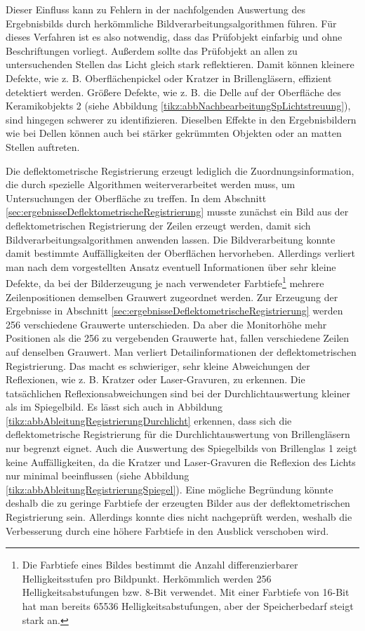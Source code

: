 \noindent
Dieser Einfluss kann zu Fehlern in der nachfolgenden Auswertung des Ergebnisbilds durch herkömmliche Bildverarbeitungsalgorithmen führen.
Für dieses Verfahren ist es also notwendig, dass das Prüfobjekt einfarbig und ohne Beschriftungen vorliegt.
Außerdem sollte das Prüfobjekt an allen zu untersuchenden Stellen das Licht gleich stark reflektieren.
Damit können kleinere Defekte, wie z. B. Oberflächenpickel oder Kratzer in Brillengläsern, effizient detektiert werden.
Größere Defekte, wie z. B. die Delle auf der Oberfläche des Keramikobjekts 2 (siehe Abbildung \ref{tikz:abbNachbearbeitungSpLichtstreuung}), sind hingegen schwerer zu identifizieren.
Dieselben Effekte in den Ergebnisbildern wie bei Dellen können auch bei stärker gekrümmten Objekten oder an matten Stellen auftreten.

\p
Die deflektometrische Registrierung erzeugt lediglich die Zuordnungsinformation, die durch spezielle Algorithmen weiterverarbeitet werden muss, um Untersuchungen der Oberfläche zu treffen.
In dem Abschnitt \ref{sec:ergebnisseDeflektometrischeRegistrierung} musste zunächst ein Bild aus der deflektometrischen Registrierung der Zeilen erzeugt werden, damit sich Bildverarbeitungsalgorithmen anwenden lassen.
Die Bildverarbeitung konnte damit bestimmte Auffälligkeiten der Oberflächen hervorheben.
Allerdings verliert man nach dem vorgestellten Ansatz eventuell Informationen über sehr kleine Defekte, da bei der Bilderzeugung je nach verwendeter Farbtiefe\footnote
{
Die Farbtiefe eines Bildes bestimmt die Anzahl differenzierbarer Helligkeitsstufen pro Bildpunkt.
Herkömmlich werden 256 Helligkeitsabstufungen bzw. 8-Bit verwendet.
Mit einer Farbtiefe von 16-Bit hat man bereits 65536 Helligkeitsabstufungen, aber der Speicherbedarf steigt stark an.
%
} mehrere Zeilenpositionen demselben Grauwert zugeordnet werden.
Zur Erzeugung der Ergebnisse in Abschnitt \ref{sec:ergebnisseDeflektometrischeRegistrierung} werden 256 verschiedene Grauwerte unterschieden.
Da aber die Monitorhöhe mehr Positionen als die 256 zu vergebenden Grauwerte hat, fallen verschiedene Zeilen auf denselben Grauwert.
Man verliert Detailinformationen der deflektometrischen Registrierung.
Das macht es schwieriger, sehr kleine Abweichungen der Reflexionen, wie z. B. Kratzer oder Laser-Gravuren, zu erkennen.
Die tatsächlichen Reflexionsabweichungen sind bei der Durchlichtauswertung kleiner als im Spiegelbild.
Es lässt sich auch in Abbildung \ref{tikz:abbAbleitungRegistrierungDurchlicht} erkennen, dass sich die deflektometrische Registrierung für die Durchlichtauswertung von Brillengläsern nur begrenzt eignet.
Auch die Auswertung des Spiegelbilds von Brillenglas 1 zeigt keine Auffälligkeiten, da die Kratzer und Laser-Gravuren die Reflexion des Lichts nur minimal beeinflussen (siehe Abbildung \ref{tikz:abbAbleitungRegistrierungSpiegel}).
Eine mögliche Begründung könnte deshalb die zu geringe Farbtiefe der erzeugten Bilder aus der deflektometrischen Registrierung sein.
Allerdings konnte dies nicht nachgeprüft werden, weshalb die Verbesserung durch eine höhere Farbtiefe in den Ausblick verschoben wird.

